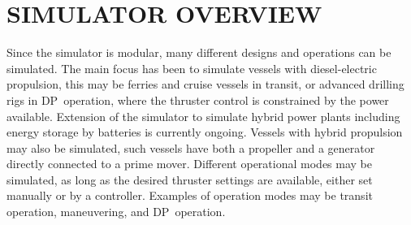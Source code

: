 \documentclass[twocolumn,10pt]{asme2e}
\begin{document}


\section*{SIMULATOR OVERVIEW}
Since the simulator is modular, many different designs and operations can be simulated.
The main focus has been to simulate vessels with diesel-electric propulsion, this may be ferries and cruise vessels in transit, or advanced drilling rigs in DP~operation, where the thruster control is constrained by the power available.
Extension of the simulator to simulate hybrid power plants including energy storage by batteries is currently ongoing.
Vessels with hybrid propulsion may also be simulated, such vessels have both a propeller and a generator directly connected to a prime mover.
Different operational modes may be simulated, as long as the desired thruster settings are available, either set manually or by a controller. 
Examples of operation modes may be transit operation, maneuvering, and DP~operation.
\end{document}
